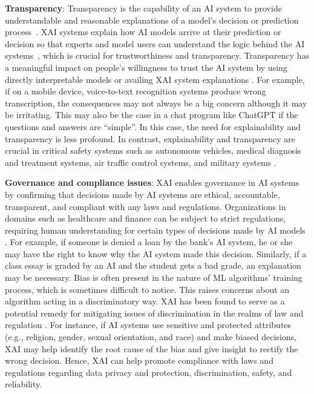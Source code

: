 \documentclass[final,5p,times,twocolumn]{elsarticle}
\begin{document}
\textbf{Transparency}: Transparency is the capability of an AI system to provide understandable and reasonable explanations of a model’s decision or prediction process~\cite{vilone2020explainable, fan2021interpretability, dam2018explainable}. XAI systems explain how AI models arrive at their prediction or decision so that experts and model users can understand the logic behind the AI systems~\cite{holzinger2019causability, ali2023explainable}, which is crucial for trustworthiness and transparency. Transparency has a meaningful impact on people’s willingness to trust the AI system by using directly interpretable models or availing XAI system	explanations \cite{zhang2020effect}. 
For example, if on a mobile device, voice-to-text recognition systems produce wrong transcription, the consequences may not always be a big concern although it may be irritating. This may also be the case in a chat program like ChatGPT if the questions and answers are ``simple''. In this case, the need for explainability and transparency is less profound. In contrast, explainability and transparency are crucial in critical safety systems such as autonomous vehicles, medical diagnosis and treatment systems, air traffic	control systems, and military systems \cite{samek2017explainable}.

\textbf{Governance and compliance issues}: XAI enables governance in AI systems by confirming that decisions made by AI systems are ethical, accountable, transparent, and compliant with any laws and regulations. Organizations in domains such as healthcare and finance can be subject to strict regulations, requiring human understanding for certain types of decisions made by AI models \cite{weller2019transparency, jordan2015machine, zhang2021survey}. For example, if someone is denied a loan by the bank's AI system, he or she may have the right to know why the AI system made this decision. Similarly, if a class essay is graded by an AI and the student gets a bad grade, an explanation may be necessary. Bias is often present in the nature of ML algorithms' training process, which is sometimes difficult to notice. This raises concerns about an algorithm acting in a discriminatory way. XAI has been found to serve as a potential remedy for mitigating issues of discrimination in the realms of law and regulation \cite{doshi2017towards}. For instance, if AI systems use sensitive and protected attributes (e.g., religion, gender, sexual orientation, and race) and make biased decisions, XAI may help identify the root cause of the bias and give insight to rectify the wrong decision. Hence, XAI can help promote compliance with laws and regulations regarding data privacy and protection, discrimination, safety, and reliability.
\end{document}
